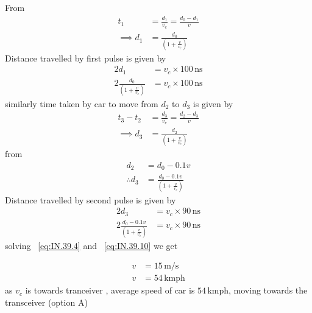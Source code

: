 \documentclass[journal,12pt,onecolumn]{IEEEtran}
\theoremstyle{remark}
\begin{document}
From ~
\begin{align}
    t_1&=\frac{d_1}{v_c}=\frac{d_0-d_1}{v}\\
\implies d_1&=\frac{d_0}{\left(1+\frac{v}{v_c}\right)}
\end{align}
Distance travelled by first pulse is given by 
\begin{align}
    2d_1 &= v_c \times 100 \, \text{ns}\\
    2\frac{d_0}{\left(1+\frac{v}{v_c}\right)}&=v_c \times 100 \, \text{ns}
    \label{eq:IN.39.4}
\end{align}
similarly time taken by car to move from $d_2$ to $d_3$ is given by
\begin{align}
    t_3-t_2&=\frac{d_3}{v_c}=\frac{d_2-d_3}{v}\\
    \implies d_3&=\frac{d_2}{\left(1+\frac{v}{v_c}\right)}
\end{align}
from ~
\begin{align}
    d_2&=d_0-0.1v\\
\therefore d_3&=\frac{d_0-0.1v}{\left(1+\frac{v}{v_c}\right)}
\end{align}
Distance travelled by second pulse is given by 
\begin{align}
    2d_3 &= v_c \times 90 \, \text{ns}\\
    2\frac{d_0-0.1v}{\left(1+\frac{v}{v_c}\right)}&= v_c \times 90 \, \text{ns} \label{eq:IN.39.10}
\end{align}
solving ~\eqref{eq:IN.39.4} and ~\eqref{eq:IN.39.10} we get

\begin{align}
    v &= 15\, \text{m/s} \\
    v &=54\, \text{kmph}
\end{align}
as $v_c$ is towards tranceiver , average speed of car is $54\,\text{kmph}$, moving towards the transceiver (option A)
\end{document}
